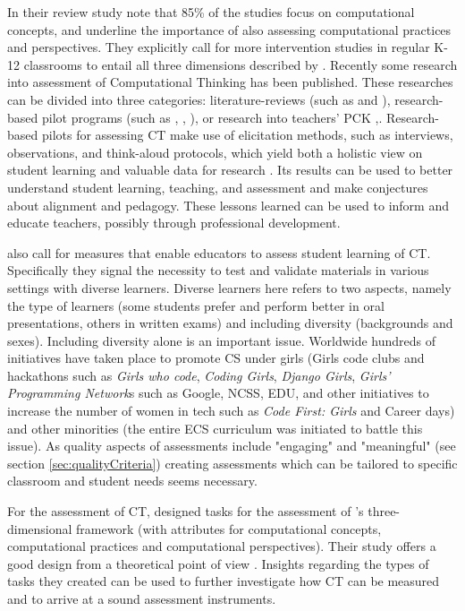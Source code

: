In their review study  note that 85\% of the studies focus on computational concepts, and underline the importance of also assessing computational practices and perspectives. They explicitly call for more intervention studies in regular K-12 classrooms to entail all three dimensions described by . Recently some research into assessment of Computational Thinking has been published. These researches can be divided into three categories: literature-reviews (such as  and ), research-based pilot programs (such as , , ), or research into teachers' PCK ,. Research-based pilots for assessing CT make use of elicitation methods, such as interviews, observations, and think-aloud protocols, which yield both a holistic view on student learning and valuable data for research \cite{grover2017measuring}. Its results can be used to better understand student learning, teaching, and assessment and make conjectures about alignment and pedagogy. These lessons learned can be used to inform and educate teachers, possibly through professional development.

 also call for measures that enable educators to assess student learning of CT. Specifically they signal the necessity to test and validate materials in various settings with diverse learners. Diverse learners here refers to two aspects, namely the type of learners (some students prefer and perform better in oral presentations, others in written exams) and including diversity (backgrounds and sexes). Including diversity alone is an important issue. Worldwide hundreds of initiatives have taken place to promote CS under girls (Girls code clubs and hackathons such as \emph{Girls who code}, \emph{Coding Girls}, \emph{Django Girls}, \emph{Girls' Programming Network}s such as Google, NCSS, EDU, and other initiatives to increase the number of women in tech such as \emph{Code First: Girls} and Career days) and other minorities (the entire ECS curriculum was initiated to battle this issue). As quality aspects of assessments include "engaging" and "meaningful" (see section \ref{sec:qualityCriteria}) creating assessments which can be tailored to specific classroom and student needs seems necessary.




For the assessment of CT,  designed tasks for the assessment of 's three-dimensional framework (with attributes for computational concepts, computational practices and computational perspectives). Their study offers a good design from a theoretical point of view \cite{voogt2017effecten}. Insights regarding the types of tasks they created can be used to further investigate how CT can be measured and to arrive at a sound assessment instruments.


